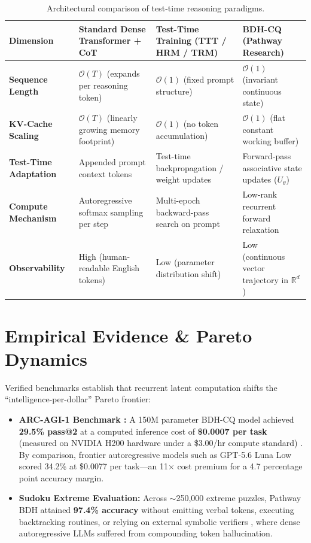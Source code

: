 \documentclass[9.5pt,a4paper]{article}
\begin{document}
\begin{table}[h!]
\centering
\footnotesize
\setlength{\tabcolsep}{3.5pt}
\renewcommand{\arraystretch}{1.02}
\begin{tabularx}{\textwidth}{@{}lXXX@{}}
\toprule
\textbf{Dimension} & \textbf{Standard Dense Transformer + CoT} & \textbf{Test-Time Training (TTT / HRM / TRM)} & \textbf{BDH-CQ (Pathway Research)} \\ \midrule
\textbf{Sequence Length} & $\mathcal{O}(T)$ (expands per reasoning token) & $\mathcal{O}(1)$ (fixed prompt structure) & $\mathcal{O}(1)$ (invariant continuous state) \\
\textbf{KV-Cache Scaling} & $\mathcal{O}(T)$ (linearly growing memory footprint) & $\mathcal{O}(1)$ (no token accumulation) & $\mathcal{O}(1)$ (flat constant working buffer) \\
\textbf{Test-Time Adaptation} & Appended prompt context tokens & Test-time backpropagation / weight updates & Forward-pass associative state updates ($U_\theta$) \\
\textbf{Compute Mechanism} & Autoregressive softmax sampling per step & Multi-epoch backward-pass search on prompt & Low-rank recurrent forward relaxation \\
\textbf{Observability} & High (human-readable English tokens) & Low (parameter distribution shift) & Low (continuous vector trajectory in $\mathbb{R}^d$) \\ \bottomrule
\end{tabularx}
\caption{Architectural comparison of test-time reasoning paradigms.}
\label{tab:comparison}
\end{table}

\vspace{-0.95em}
\section{Empirical Evidence \& Pareto Dynamics}
\vspace{-0.25em}
Verified benchmarks establish that recurrent latent computation shifts the ``intelligence-per-dollar'' Pareto frontier:
\begin{itemize}
    \item \textbf{ARC-AGI-1 Benchmark \cite{chollet2019}:} A 150M parameter BDH-CQ model achieved \textbf{29.5\% pass@2} at a computed inference cost of \textbf{\$0.0007 per task} (measured on NVIDIA H200 hardware under a \$3.00/hr compute standard) \cite{bdhcq2026}. By comparison, frontier autoregressive models such as GPT-5.6 Luna Low scored 34.2\% at \$0.0077 per task---an 11$\times$ cost premium for a 4.7 percentage point accuracy margin.
    \item \textbf{Sudoku Extreme Evaluation:} Across $\sim$250,000 extreme puzzles, Pathway BDH attained \textbf{97.4\% accuracy} without emitting verbal tokens, executing backtracking routines, or relying on external symbolic verifiers \cite{pathway2025}, where dense autoregressive LLMs suffered from compounding token hallucination.
\end{itemize}
\end{document}
